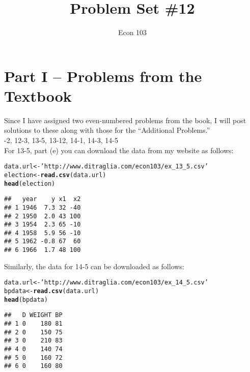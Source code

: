\documentclass[addpoints,12pt]{exam}\usepackage[]{graphicx}\usepackage[]{color}
\title{Problem Set \#12}
\author{Econ 103}
\date{}
\makeatletter
\newcommand{\hlstr}[1]{\textcolor[rgb]{0.192,0.494,0.8}{#1}}%
\newcommand{\hlstd}[1]{\textcolor[rgb]{0.345,0.345,0.345}{#1}}%
\newcommand{\hlkwb}[1]{\textcolor[rgb]{0.69,0.353,0.396}{#1}}%
\newcommand{\hlkwd}[1]{\textcolor[rgb]{0.737,0.353,0.396}{\textbf{#1}}}%
\newenvironment{kframe}{%
 \def\at@end@of@kframe{}%
 \ifinner\ifhmode%
  \def\at@end@of@kframe{\end{minipage}}%
  \begin{minipage}{\columnwidth}%
 \fi\fi%
 \def\FrameCommand##1{\hskip\@totalleftmargin \hskip-\fboxsep
 \colorbox{shadecolor}{##1}\hskip-\fboxsep
     \hskip-\linewidth \hskip-\@totalleftmargin \hskip\columnwidth}%
 \MakeFramed {\advance\hsize-\width
   \@totalleftmargin\z@ \linewidth\hsize
   \@setminipage}}%
 {\par\unskip\endMakeFramed%
 \at@end@of@kframe}
\newenvironment{knitrout}{}{} %
\makeatother
\begin{document}
\maketitle

\section*{Part I -- Problems from the Textbook}
\noindent Since I have assigned two even-numbered problems from the book, I will post solutions to these along with those for the ``Additional Problems.''\\

-2, 12-3, 13-5, 13-12, 14-1, 14-3, 14-5\\

\noindent For 13-5, part (e) you can download the data from my website as follows:
\begin{knitrout}
\color{fgcolor}\begin{kframe}
\begin{alltt}
\hlstd{data.url} \hlkwb{<-} \hlstr{'http://www.ditraglia.com/econ103/ex_13_5.csv'}
\hlstd{election} \hlkwb{<-} \hlkwd{read.csv}\hlstd{(data.url)}
\hlkwd{head}\hlstd{(election)}
\end{alltt}
\begin{verbatim}
##   year    y x1  x2
## 1 1946  7.3 32 -40
## 2 1950  2.0 43 100
## 3 1954  2.3 65 -10
## 4 1958  5.9 56 -10
## 5 1962 -0.8 67  60
## 6 1966  1.7 48 100
\end{verbatim}
\end{kframe}
\end{knitrout}
\noindent Similarly, the data for 14-5 can be downloaded as follows:
\begin{knitrout}
\color{fgcolor}\begin{kframe}
\begin{alltt}
\hlstd{data.url} \hlkwb{<-} \hlstr{'http://www.ditraglia.com/econ103/ex_14_5.csv'}
\hlstd{bpdata} \hlkwb{<-} \hlkwd{read.csv}\hlstd{(data.url)}
\hlkwd{head}\hlstd{(bpdata)}
\end{alltt}
\begin{verbatim}
##   D WEIGHT BP
## 1 0    180 81
## 2 0    150 75
## 3 0    210 83
## 4 0    140 74
## 5 0    160 72
## 6 0    160 80
\end{verbatim}
\end{kframe}
\end{knitrout}
\end{document}
